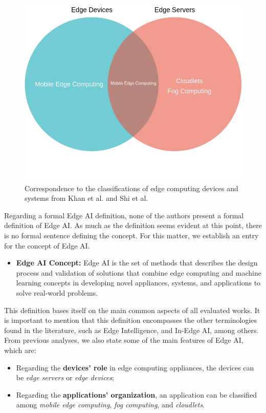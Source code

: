 \begin{figure}[ht!]
    \centering
    \includegraphics[width = .6\linewidth]{Figures/organization.png}
    \caption{Correspondence to the classifications of edge computing devices and systems from Khan et al. \cite{khan2019edge} and Shi et al. \cite{shi2016promise}}
    \label{fig:organization}
\end{figure}

Regarding a formal Edge AI definition, none of the authors present a formal definition of Edge AI. As much as the definition seems evident at this point, there is no formal sentence defining the concept. For this matter, we establish an entry for the concept of Edge AI.

\begin{itemize}
    \item \textbf{Edge AI Concept:} Edge AI is the set of methods that describes the design process and validation of solutions that combine edge computing and machine learning concepts in developing novel appliances, systems, and applications to solve real-world problems.
\end{itemize}

This definition bases itself on the main common aspects of all evaluated works. It is important to mention that this definition encompasses the other terminologies found in the literature, such as Edge Intelligence, and In-Edge AI, among others. From previous analyses, we also state some of the main features of Edge AI, which are:

\begin{itemize}
    \item Regarding the \textbf{devices' role} in edge computing appliances, the devices can be \textit{edge servers} or \textit{edge devices};
    \item Regarding the \textbf{applications' organization}, an application can be classified among \textit{mobile edge computing}, \textit{fog computing}, and \textit{cloudlets}.
\end{itemize}

